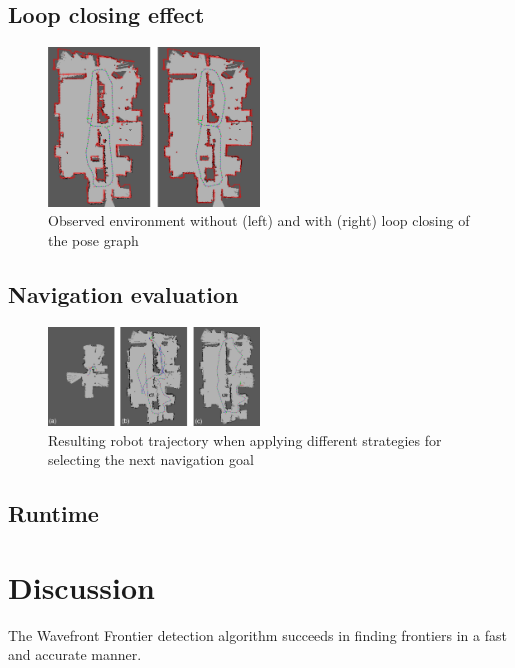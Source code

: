 \documentclass{ba-kecs}
\begin{document}
\subsection{Loop closing effect}

\begin{figure}[htbp]
	\centering
		\includegraphics[width=0.50\textwidth]{figures/Loop_closing_compared.jpg}
	\caption{Observed environment without (left) and with (right) loop closing of the pose graph}
	\label{fig:loop_closing_comparison}
\end{figure}

\subsection{Navigation evaluation}

\begin{figure}[htbp]
	\centering
		\includegraphics[width=0.50\textwidth]{figures/Navigation_comparison.jpg}
	\caption{Resulting robot trajectory when applying different strategies for selecting the next navigation goal}
	\label{fig:navigation_comparison}
\end{figure}

\subsection{Runtime}

\label{sec:exp}

\section{Discussion}
\label{sec:disc}
The Wavefront Frontier detection algorithm \citep{Keidar} succeeds in finding frontiers in a fast and accurate manner.
\end{document}
